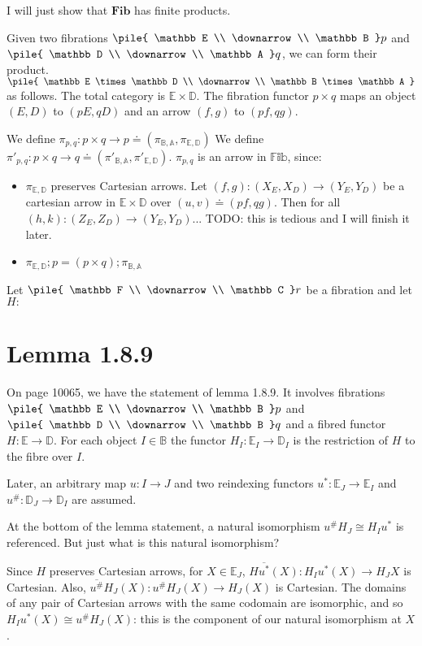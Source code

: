 \documentclass{article}
\newcommand{\mbf}{\mathbf}
\newcommand{\vrt}[2]{
\pile{
#1 \\
\downarrow \\
#2
}
}
\begin{document}
I will just show that $\mbf{Fib}$ has finite products.

Given two fibrations $\vrt{\mathbb E}{\mathbb B}p$ and $\vrt{\mathbb D}{\mathbb A}q$, we can form their product.
$\vrt{\mathbb E \times \mathbb D}{\mathbb B \times \mathbb A}$ as follows. The total category is $\mathbb E \times \mathbb D$.
The fibration functor $p \times q$ maps an object $(E,D)$ to $(pE,qD)$ and an arrow $(f,g)$ to $(pf,qg)$.

We define $\pi_{p,q} : p \times q \to p \doteq (\pi_{\mathbb B, \mathbb A},\pi_{\mathbb E, \mathbb D})$ 
We define
$\pi'_{p,q} : p \times q \to q \doteq (\pi'_{\mathbb B, \mathbb A}, \pi'_{\mathbb E, \mathbb D})$.
$\pi_{p,q}$ is an arrow in $\mathbb{Fib}$, since:

\begin{itemize}
\item $\pi_{\mathbb E, \mathbb D}$ preserves Cartesian arrows. 
Let $(f,g) : (X_E,X_D) \to (Y_E,Y_D)$ be a cartesian arrow in $\mathbb E \times \mathbb D$
over $(u,v) \doteq (pf,qg)$.
Then for all $(h,k) : (Z_E,Z_D) \to (Y_E,Y_D)$... TODO: this is tedious and I will finish it later.

\item $\pi_{\mathbb E,\mathbb D};p = (p \times q);\pi_{\mathbb B, \mathbb A}$
\end{itemize}

Let $\vrt{\mathbb F}{\mathbb C} r$ be a fibration and let $H : $

\section*{Lemma 1.8.9}

On page 10065, we have the statement of lemma 1.8.9.
It involves fibrations $\vrt{\mathbb E}{\mathbb B}p$ and $\vrt{\mathbb D}{\mathbb B}q$
and a fibred functor $H : \mathbb E \to \mathbb D$. For each object $I \in \mathbb B$ the functor 
$H_I : \mathbb E_I \to \mathbb D_I$ is the restriction of $H$ to the fibre over $I$.

Later, an arbitrary map $u : I \to J$ and two reindexing functors $u^* : \mathbb E_J \to \mathbb E_I$ and $u^{\#} : \mathbb D_J \to \mathbb D_I$ are assumed.

At the bottom of the lemma statement, a natural isomorphism $u^{\#} H_J \cong H_I u^*$ is referenced.
But just what is this natural isomorphism?

Since $H$ preserves Cartesian arrows, for $X \in \mathbb E_J$,  $H \overline{u^*}(X) : H_I u^*(X) \to H_J X$ is Cartesian. Also, $\overline{u^{\#}} H_J(X) : u^{\#} H_J(X) \to H_J(X)$ is Cartesian. The domains of any pair of Cartesian arrows with the same 
codomain are isomorphic, and so $H_I u^*(X) \cong u^{\#} H_J(X)$: this is the component of our natural isomorphism at $X$.
\end{document}
